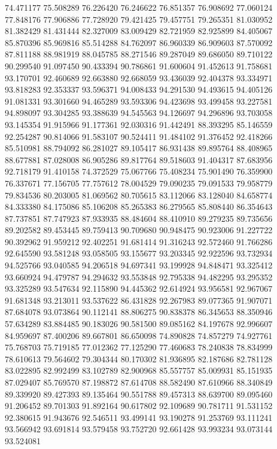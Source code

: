 74.471177
75.508289
76.226420
76.246622
76.851357
76.908692
77.060124
77.848176
77.906886
77.728920
79.421425
79.457751
79.265351
81.030952
81.382429
81.431444
82.327009
83.009429
82.721959
82.925899
84.405067
85.870396
85.969816
85.514288
84.762097
86.960339
86.909603
87.570092
87.811188
88.981919
88.045785
88.271546
89.287049
89.686050
89.710122
90.299540
91.097450
90.433394
90.786861
91.600604
91.452613
91.758681
93.170701
92.460689
92.663880
92.668059
93.436039
92.404378
93.334971
93.818283
92.353337
93.596371
94.008433
94.291530
94.493615
94.405126
91.081331
93.301660
94.465289
93.593306
94.423698
93.499458
93.227581
94.898097
93.304285
93.388639
94.545563
94.126697
94.296896
93.703058
93.145354
91.915966
91.177361
92.030316
91.442491
88.393295
85.146559
92.254287
90.814066
91.583107
90.524411
91.484102
91.376452
92.418266
85.510981
88.794092
86.281027
89.105417
86.931438
89.895764
88.408965
88.677881
87.028008
86.905286
89.817764
89.518603
91.404317
87.683956
92.718179
91.410158
74.372529
75.067766
75.408234
75.901490
76.359900
76.337671
77.156705
77.757612
78.004529
79.090235
79.091533
79.958779
79.834536
80.203005
81.069562
80.705615
83.112066
83.128040
84.658774
84.333380
84.175086
85.106208
85.265383
86.279565
85.808440
86.354643
87.737851
87.747923
87.933935
88.484604
88.410910
89.279235
89.735656
89.202582
89.453445
89.759413
90.709680
90.948475
90.923006
91.227722
90.392962
91.959212
92.402251
91.681414
91.316243
92.572460
91.766286
92.645590
93.581248
93.058505
93.155677
93.203345
92.922596
93.732934
94.525766
93.040585
94.206518
94.697341
93.199928
94.848471
93.325412
93.660924
94.479787
94.294632
93.553848
92.795338
94.482295
93.295352
93.325289
93.547634
92.115890
94.445362
92.614924
93.956581
92.967067
91.681348
93.213011
93.537622
86.431828
92.267983
89.077365
91.907071
87.684078
93.073864
90.112141
88.806275
90.838378
86.345653
88.350946
57.634289
83.884485
90.183026
90.581500
89.085162
84.197678
92.996607
84.959697
87.400206
89.667801
86.650098
74.890828
74.857279
74.927761
75.768703
75.719185
77.012362
77.125290
77.460683
78.240838
78.834999
78.610613
79.564602
79.304344
80.170302
81.936895
82.187686
82.781128
83.022895
82.992499
83.102789
82.900968
85.557757
85.009931
85.151935
87.029407
85.769570
87.198872
87.614708
88.582490
87.610966
88.340849
89.339920
89.427393
89.135464
90.551788
89.457313
88.639700
89.095460
91.206452
89.701303
91.892164
90.617802
92.109689
90.781711
91.531152
92.380615
91.943676
92.546511
93.499141
93.190278
91.253769
93.111241
93.566942
93.691814
93.579458
93.752720
92.661428
93.993234
93.073144
93.524081
